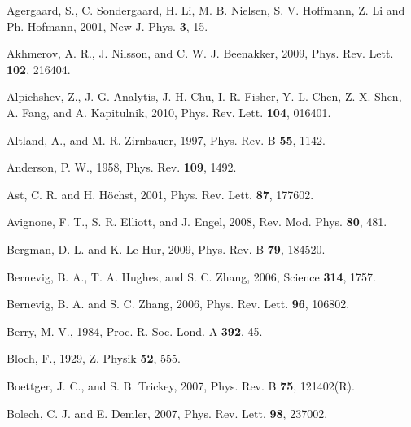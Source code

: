\documentclass[twocolumn,floatfix,showpacs,rmp,aps]{revtex4}
\begin{document}
	
	\begin{thebibliography}{99}
		
		Agergaard, S., C. Sondergaard, H. Li, M. B. Nielsen, S. V. Hoffmann,
		Z. Li and Ph. Hofmann, 2001,
		New J. Phys. {\bf 3}, 15.
		
		Akhmerov, A. R., J. Nilsson, and C. W. J. Beenakker, 2009,
		Phys. Rev. Lett. {\bf 102}, 216404.
		
		Alpichshev, Z., J. G. Analytis, J. H. Chu, I. R. Fisher, Y. L. Chen, Z. X. Shen,
		A. Fang, and A. Kapitulnik, 2010,
		Phys. Rev. Lett. {\bf 104}, 016401.
		
		Altland, A., and M. R. Zirnbauer, 1997,
		Phys. Rev. B {\bf 55}, 1142.
		
		Anderson, P. W., 1958,
		Phys. Rev. {\bf 109}, 1492.
		
		Ast, C. R.  and H. H\"ochst, 2001,
		Phys. Rev. Lett. {\bf 87}, 177602.
		
		Avignone, F. T., S. R. Elliott, and J. Engel, 2008,
		Rev. Mod. Phys. {\bf 80}, 481.
		
		Bergman, D. L. and K. Le Hur, 2009,
		Phys. Rev. B {\bf 79}, 184520.
		
		Bernevig, B. A., T. A. Hughes, and S. C. Zhang, 2006,
		Science {\bf 314}, 1757.
		
		Bernevig, B. A. and S. C. Zhang, 2006,
		Phys. Rev. Lett. {\bf 96}, 106802.
		
		Berry, M. V., 1984,
		Proc. R. Soc. Lond. A {\bf 392}, 45.
		
		Bloch, F., 1929,
		Z. Physik {\bf 52}, 555.
		
		Boettger, J. C., and S. B. Trickey, 2007,
		Phys. Rev. B {\bf 75}, 121402(R).
		
		Bolech, C. J. and E. Demler, 2007,
		Phys. Rev. Lett. {\bf 98}, 237002.
		

\end{thebibliography}
\end{document}
